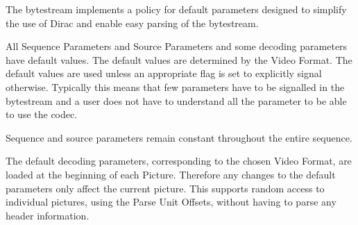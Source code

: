 The bytestream implements a policy for default parameters designed to
simplify the use of Dirac and enable easy parsing of the bytestream.

All Sequence Parameters and Source Parameters and some decoding
parameters have default values. The default values are determined by the
Video Format. The default values are used unless an appropriate flag is
set to explicitly signal otherwise. Typically this means that few
parameters have to be signalled in the bytestream and a user does not
have to understand all the parameter to be able to use the codec.

Sequence and source parameters remain constant throughout the entire
sequence.

The default decoding parameters, corresponding to the chosen Video
Format, are loaded at the beginning of each Picture. Therefore any
changes to the default parameters only affect the current picture. This
supports random access to individual pictures, using the Parse Unit
Offsets, without having to parse any header information.
